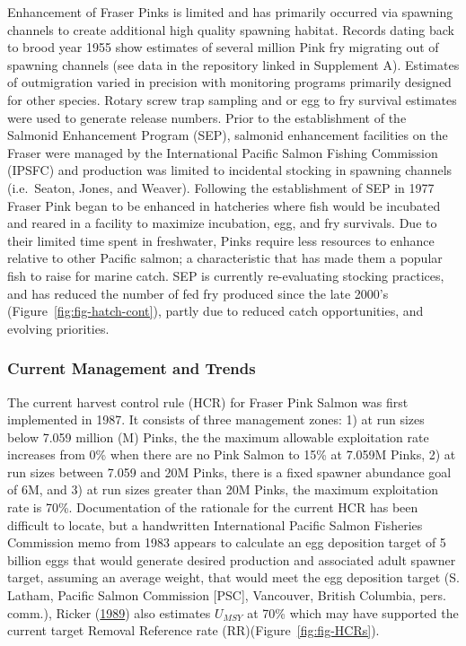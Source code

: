 \documentclass[11pt]{book}
\begin{document}
Enhancement of Fraser Pinks is limited and has primarily occurred via spawning channels to create additional high quality spawning habitat. Records dating back to brood year 1955 show estimates of several million Pink fry migrating out of spawning channels (see data in the repository linked in Supplement A). Estimates of outmigration varied in precision with monitoring programs primarily designed for other species. Rotary screw trap sampling and or egg to fry survival estimates were used to generate release numbers. Prior to the establishment of the Salmonid Enhancement Program (SEP), salmonid enhancement facilities on the Fraser were managed by the International Pacific Salmon Fishing Commission (IPSFC) and production was limited to incidental stocking in spawning channels (i.e.~Seaton, Jones, and Weaver). Following the establishment of SEP in 1977 Fraser Pink began to be enhanced in hatcheries where fish would be incubated and reared in a facility to maximize incubation, egg, and fry survivals. Due to their limited time spent in freshwater, Pinks require less resources to enhance relative to other Pacific salmon; a characteristic that has made them a popular fish to raise for marine catch. SEP is currently re-evaluating stocking practices, and has reduced the number of fed fry produced since the late 2000's (Figure~\ref{fig:fig-hatch-cont}), partly due to reduced catch opportunities, and evolving priorities.

\hypertarget{current-management-and-trends}{%
\subsubsection{Current Management and Trends}\label{current-management-and-trends}}

The current harvest control rule (HCR) for Fraser Pink Salmon was first implemented in 1987. It consists of three management zones: 1) at run sizes below 7.059 million (M) Pinks, the the maximum allowable exploitation rate increases from 0\% when there are no Pink Salmon to 15\% at 7.059M Pinks, 2) at run sizes between 7.059 and 20M Pinks, there is a fixed spawner abundance goal of 6M, and 3) at run sizes greater than 20M Pinks, the maximum exploitation rate is 70\%. Documentation of the rationale for the current HCR has been difficult to locate, but a handwritten International Pacific Salmon Fisheries Commission memo from 1983 appears to calculate an egg deposition target of 5 billion eggs that would generate desired production and associated adult spawner target, assuming an average weight, that would meet the egg deposition target (S. Latham, Pacific Salmon Commission {[}PSC{]}, Vancouver, British Columbia, pers. comm.), Ricker (\protect\hyperlink{ref-rickerHistoryPresentState1989}{1989}) also estimates \(U_{MSY}\) at 70\% which may have supported the current target Removal Reference rate (RR)(Figure~\ref{fig:fig-HCRs}).
\end{document}
